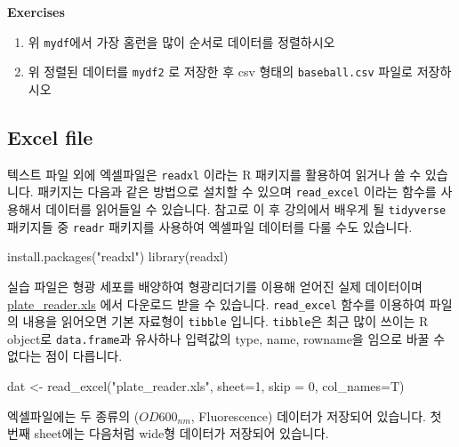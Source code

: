 \documentclass[
]{book}
\newenvironment{Shaded}{\begin{snugshade}}{\end{snugshade}}
\newcommand{\AttributeTok}[1]{\textcolor[rgb]{0.77,0.63,0.00}{#1}}
\newcommand{\DecValTok}[1]{\textcolor[rgb]{0.00,0.00,0.81}{#1}}
\newcommand{\FunctionTok}[1]{\textcolor[rgb]{0.00,0.00,0.00}{#1}}
\newcommand{\NormalTok}[1]{#1}
\newcommand{\OtherTok}[1]{\textcolor[rgb]{0.56,0.35,0.01}{#1}}
\newcommand{\StringTok}[1]{\textcolor[rgb]{0.31,0.60,0.02}{#1}}
\providecommand{\tightlist}{%
  \setlength{\itemsep}{0pt}\setlength{\parskip}{0pt}}
\begin{document}
\textbf{Exercises}

\begin{enumerate}
\def\labelenumi{\arabic{enumi}.}
\tightlist
\item
  위 \texttt{mydf}에서 가장 홈런을 많이 순서로 데이터를 정렬하시오
\item
  위 정렬된 데이터를 \texttt{mydf2} 로 저장한 후 csv 형태의 \texttt{baseball.csv} 파일로 저장하시오
\end{enumerate}

\hypertarget{excel-file}{%
\subsection{Excel file}\label{excel-file}}

텍스트 파일 외에 엑셀파일은 \texttt{readxl} 이라는 R 패키지를 활용하여 읽거나 쓸 수 있습니다. 패키지는 다음과 같은 방법으로 설치할 수 있으며 \texttt{read\_excel} 이라는 함수를 사용해서 데이터를 읽어들일 수 있습니다. 참고로 이 후 강의에서 배우게 될 \texttt{tidyverse} 패키지들 중 \texttt{readr} 패키지를 사용하여 엑셀파일 데이터를 다룰 수도 있습니다.

\begin{Shaded}
\begin{Highlighting}[]
\FunctionTok{install.packages}\NormalTok{(}\StringTok{"readxl"}\NormalTok{)}
\FunctionTok{library}\NormalTok{(readxl)}
\end{Highlighting}
\end{Shaded}

실습 파일은 형광 세포를 배양하여 형광리더기를 이용해 얻어진 실제 데이터이며 \url{plate_reader.xls} 에서 다운로드 받을 수 있습니다. \texttt{read\_excel} 함수를 이용하여 파일의 내용을 읽어오면 기본 자료형이 \texttt{tibble} 입니다. \texttt{tibble}은 최근 많이 쓰이는 R object로 \texttt{data.frame}과 유사하나 입력값의 type, name, rowname을 임으로 바꿀 수 없다는 점이 다릅니다.

\begin{Shaded}
\begin{Highlighting}[]

\NormalTok{dat }\OtherTok{\textless{}{-}} \FunctionTok{read\_excel}\NormalTok{(}\StringTok{"plate\_reader.xls"}\NormalTok{, }\AttributeTok{sheet=}\DecValTok{1}\NormalTok{, }\AttributeTok{skip =} \DecValTok{0}\NormalTok{, }\AttributeTok{col\_names=}\NormalTok{T)}
\end{Highlighting}
\end{Shaded}

엑셀파일에는 두 종류의 (\(OD600_{nm}\), Fluorescence) 데이터가 저장되어 있습니다. 첫 번째 sheet에는 다음처럼 wide형 데이터가 저장되어 있습니다.
\end{document}
